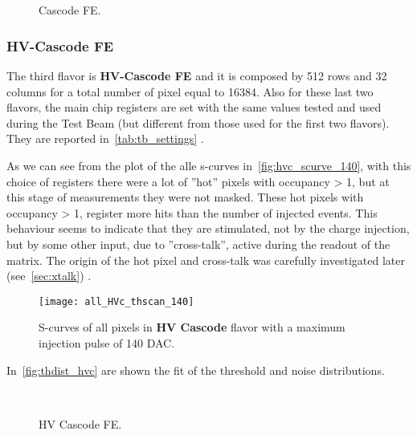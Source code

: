 \begin{figure}[h!]
\centering
{}\quad
{}\\
\quad
{}\\
\caption{Cascode FE.}
\label{fig:thdist_casc}
\end{figure}



\subsubsection{HV-Cascode FE}


The third flavor is \textbf{HV-Cascode FE} and it is composed by 512 rows and 32 columns for a total number of pixel equal to 16384. Also for these last two flavors, the main chip registers are set with the same values tested and used during the Test Beam (but different from those used for the first two flavors). They are reported in~\autoref{tab:tb_settings} .

As we can see from the plot of the alle s-curves in~\autoref{fig:hvc_scurve_140}, with this choice of registers there were a lot of ''hot'' pixels with occupancy > 1, but at this stage of measurements they were not masked.
These hot pixels with occupancy > 1, register more hits than the number of injected events. This behaviour seems to indicate that they are stimulated, not by the charge injection, but by some other input, due to ''cross-talk'', active during the readout of the matrix. The origin of the hot pixel and cross-talk was carefully investigated later (see~\autoref{sec:xtalk})
.

\begin{figure}[h!]
\centering
\texttt{[image: all\_HVc\_thscan\_140]}
\caption{S-curves of all pixels in \textbf{HV Cascode} flavor with a maximum injection pulse of 140 DAC.}
\label{fig:hvc_scurve_140}
\end{figure}

In~\autoref{fig:thdist_hvc} are shown the fit of the threshold and noise distributions.

\begin{figure}[h!]
\centering
{}\quad
{}\\
\caption{HV Cascode FE.}
\label{fig:thdist_hvc}
\end{figure}


